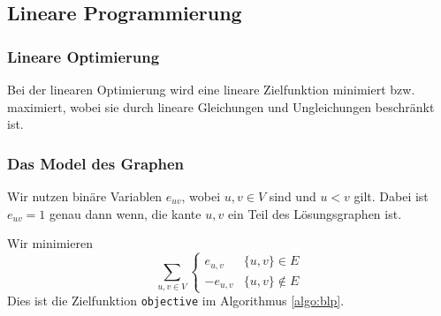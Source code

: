 \documentclass[12pt,a4paper,onecolumn,oneside,titlepage]{article}
\newcommand{\vars}{\texttt}
\begin{document}
\subsection{Lineare Programmierung}
\subsubsection{Lineare Optimierung}
Bei der linearen Optimierung wird eine lineare Zielfunktion minimiert bzw. maximiert, wobei sie durch lineare Gleichungen und Ungleichungen beschränkt ist.
\subsubsection{Das Model des Graphen}
Wir nutzen binäre Variablen $e_{uv}$, wobei $u,v \in V$ sind und $u < v$ gilt.
Dabei ist $e_{uv} = 1$ genau dann wenn, die kante ${u,v}$ ein Teil des Lösungsgraphen ist.

Wir minimieren \[\sum_{u,v \in V} 
\begin{cases} 
      e_{u,v} & \{u,v\} \in E \\
      -e_{u,v} & \{u,v\} \notin E
   \end{cases}\]
Dies ist die Zielfunktion \vars{objective} im Algorithmus \ref{algo:blp}.
\end{document}
